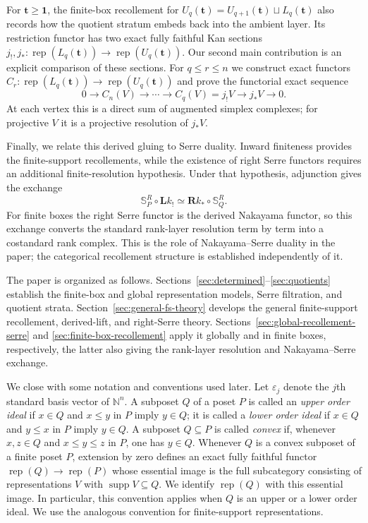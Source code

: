 \documentclass[12pt,reqno]{amsart}
\theoremstyle{definition}
\theoremstyle{remark}
\newcommand{\Rep}{\operatorname{rep}}
\begin{document}
For $\mathbf t\ge\mathbf1$, the finite-box recollement for
$U_q(\mathbf t)=U_{q+1}(\mathbf t)\sqcup L_q(\mathbf t)$ also records how
the quotient stratum embeds back into the ambient layer.  Its restriction
functor has two exact fully faithful Kan sections
$j_!,j_*:\Rep(L_q(\mathbf t))\to\Rep(U_q(\mathbf t))$.  Our second main
contribution is an explicit comparison of these sections.  For $q\le r\le n$
we construct exact functors
$C_r:\Rep(L_q(\mathbf t))\to\Rep(U_q(\mathbf t))$ and prove the functorial
exact sequence
\begin{equation}\label{eq:intro-rank-resolution}
0\longrightarrow C_n(V)\longrightarrow\cdots\longrightarrow
C_q(V)=j_!V\longrightarrow j_*V\longrightarrow0.
\end{equation}
At each vertex this is a direct sum of augmented simplex complexes; for
projective $V$ it is a projective resolution of $j_*V$.

Finally, we relate this derived gluing to Serre duality.  Inward finiteness
provides the finite-support recollements, while the existence of right Serre
functors requires an additional finite-resolution hypothesis.  Under that
hypothesis, adjunction gives the exchange
\[
\mathbb S_P^R\circ\mathbf Lk_!
\simeq
\mathbf Rk_*\circ\mathbb S_Q^R.
\]
For finite boxes the right Serre functor is the derived Nakayama functor, so
this exchange converts the standard rank-layer resolution term by term into
a costandard rank complex.  This is the role of Nakayama--Serre duality in the
paper; the categorical recollement structure is established independently of
it.

The paper is organized as follows.  Sections~\ref{sec:determined}--\ref{sec:quotients}
establish the finite-box and global representation models, Serre filtration,
and quotient strata.  Section~\ref{sec:general-fs-theory} develops the general
finite-support recollement, derived-lift, and right-Serre theory.
Sections~\ref{sec:global-recollement-serre} and
\ref{sec:finite-box-recollement} apply it globally and in finite boxes, respectively, the
latter also giving the rank-layer resolution and Nakayama--Serre exchange.

We close with some notation and conventions used later.  Let $\varepsilon_j$ denote the
$j$th standard basis vector of $\mathbb N^n$.  A subposet $Q$ of a
poset $P$ is called an \emph{upper order ideal} if $x\in Q$ and
$x\le y$ in $P$ imply $y\in Q$; it is called a \emph{lower order ideal}
if $x\in Q$ and $y\le x$ in $P$ imply $y\in Q$.  A subposet
$Q\subseteq P$ is called \emph{convex} if, whenever $x,z\in Q$ and
$x\le y\le z$ in $P$, one has $y\in Q$.  Whenever $Q$ is a convex
subposet of a finite poset $P$, extension by zero defines an exact fully
faithful functor $\Rep(Q)\to\Rep(P)$ whose essential image is the full
subcategory consisting of representations $V$ with
$\operatorname{supp}V\subseteq Q$.  We identify $\Rep(Q)$ with this
essential image.  In particular, this convention applies when $Q$ is an
upper or a lower order ideal.  We use the analogous convention for
finite-support representations.
\end{document}
